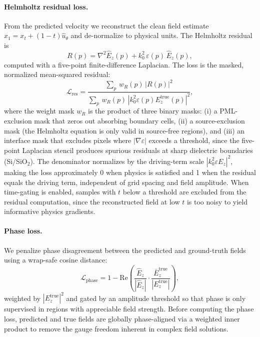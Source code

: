 \paragraph{Helmholtz residual loss.}
From the predicted velocity we reconstruct the clean field estimate
$\hat{x}_1 = x_t + (1-t)\hat{u}_\theta$ and de-normalize to physical units. The Helmholtz residual is
\begin{equation}
    R(p) = \nabla^2 \hat{E}_z(p) + k_0^2\,\varepsilon(p)\,\hat{E}_z(p),
    \label{eq:residual}
\end{equation}
computed with a five-point finite-difference Laplacian. The loss is the masked, normalized mean-squared residual:
\begin{equation}
    \mathcal{L}_\text{res} = \frac{\sum_p\, w_R(p)\,|R(p)|^2}{\sum_p\, w_R(p)\,|k_0^2\varepsilon(p) E_z^\text{true}(p)|^2},
    \label{eq:residual_loss}
\end{equation}
where the weight mask $w_R$ is the product of three binary masks: (i) a PML-exclusion mask that zeros out absorbing
boundary cells, (ii) a source-exclusion mask (the Helmholtz equation is only valid in source-free regions), and (iii)
an interface mask that excludes pixels where $|\nabla\varepsilon|$ exceeds a threshold, since the five-point Laplacian
stencil produces spurious residuals at sharp dielectric boundaries (Si/SiO$_2$). The denominator normalizes by the
driving-term scale $|k_0^2\varepsilon E_z|^2$, making the loss approximately 0 when physics is satisfied and 1 when
the residual equals the driving term, independent of grid spacing and field amplitude. When time-gating is enabled,
samples with $t$ below a threshold are excluded from the residual computation, since the reconstructed field at low $t$
is too noisy to yield informative physics gradients.

\paragraph{Phase loss.}
We penalize phase disagreement between the predicted and ground-truth fields using a
wrap-safe cosine distance:
\begin{equation}
    \mathcal{L}_\text{phase} = 1 - \mathrm{Re}\!\left(\frac{\hat{E}_z}{|\hat{E}_z|} \cdot
    \frac{\bar{E}_z^\text{true}}{|E_z^\text{true}|}\right),
    \label{eq:phase_loss}
\end{equation}
weighted by $|E_z^\text{true}|^2$ and gated by an amplitude threshold so that phase is only supervised in regions with
appreciable field strength. Before computing the phase loss, predicted and true fields are globally phase-aligned via a
weighted inner product to remove the gauge freedom inherent in complex field solutions.


